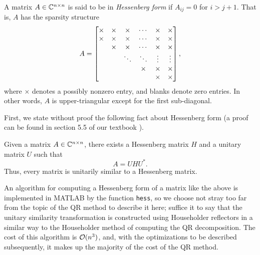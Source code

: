 \documentclass{article}
\begin{document}
\begin{definition}
	A matrix $A\in \mathbb{C}^{n\times n}$ is said to be in \emph{Hessenberg form} if $A_{ij} = 0$ for $i >j+1$. That is, $A$ has the sparsity structure
	\begin{equation*}
		A = \left[\begin{matrix}
			\times & \times & \times & \cdots & \times & \times \\
			\times & \times & \times & \cdots & \times & \times \\
			& \times & \times & \cdots & \times & \times  \\
			& &\ddots & \ddots & \vdots & \vdots \\
			& & & \times & \times & \times\\
			& & & & \times & \times
		\end{matrix}\right],
	\end{equation*}
	where $\times$ denotes a possibly nonzero entry, and blanks denote zero entries. In other words, $A$ is upper-triangular except for the first sub-diagonal.
\end{definition}

First, we state without proof the following fact about Hessenberg form (a proof can be found in section 5.5 of our textbook \cite{ackleh_2009}).
\begin{theorem}
	Given a matrix $A \in \mathbb{C}^{n\times n}$, there exists a Hessenberg matrix $H$ and a unitary matrix $U$ such that
	\begin{equation*}
		A = UHU^*.
	\end{equation*}
	Thus, every matrix is unitarily similar to a Hessenberg matrix.
\end{theorem}
An algorithm for computing a Hessenberg form of a matrix like the above is implemented in MATLAB by the function \texttt{hess}, so we choose not stray too far from the topic of the QR method to describe it here; suffice it to say that the unitary similarity transformation is constructed using Householder reflectors in a similar way to the Householder method of computing the QR decomposition. The cost of this algorithm is $\mathcal{O}(n^3)$, and, with the optimizations to be described subsequently, it makes up the majority of the cost of the QR method.
\end{document}
